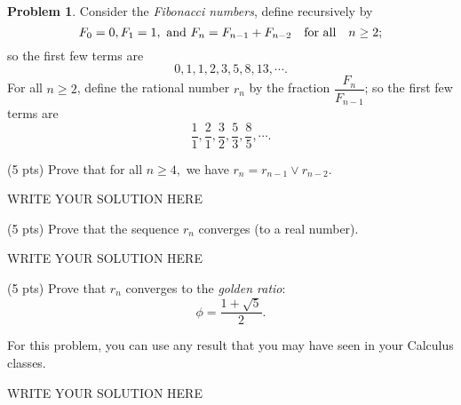 \documentclass[11pt]{article}
\theoremstyle{plain}
\theoremstyle{definition}
\newtheorem{problem}{Problem}
\theoremstyle{remark}
\numberwithin{equation}{problem}
\begin{document}
\begin{problem}
	Consider the \emph{Fibonacci numbers}, define recursively by
	\[
		F_0 = 0, F_1 = 1, \text{ and } F_n = F_{n-1} + F_{n-2} \quad\text{for all}\quad 
		n\geq 2;
	\]
	so the first few terms are 
	\[
		0,1,1,2,3,5,8,13,\cdots.
	\]
	For all $n\geq 2$, define the rational number $r_n$ by the fraction $\dfrac{F_n}{F_{n-1}}$; so the first few terms are
	\[
		\frac{1}{1}, \frac{2}{1}, \frac{3}{2}, \frac{5}{3}, \frac{8}{5}, \cdots.
	\]
	\begin{listinprob}
	\item (5 pts) Prove that for all $n\geq 4,$ we have $r_n = r_{n-1} \vee r_{n-2}$.
\begin{solution} %
WRITE YOUR SOLUTION HERE
\end{solution}\clearpage %
	\item (5 pts) Prove that the sequence $r_n$ converges (to a real number).
\begin{solution} %
WRITE YOUR SOLUTION HERE
\end{solution}\clearpage %
	\item (5 pts) Prove that $r_n$ converges to the \emph{golden ratio}:
	\[
		\phi = \frac{1 + \sqrt{5}}{2}.
	\]
	\end{listinprob}
	For this problem, you can use any result that you may have seen in your Calculus classes.
\end{problem}
\begin{solution} %
WRITE YOUR SOLUTION HERE
\end{solution}\clearpage %
\end{document}
